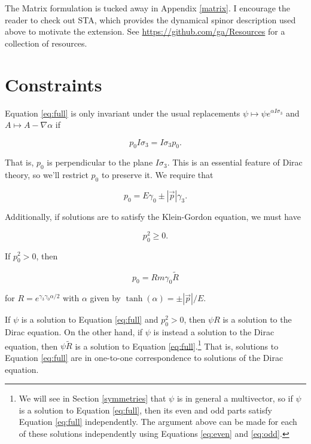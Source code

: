 \documentclass{article}
\begin{document}
  The Matrix formulation is tucked away in Appendix \ref{matrix}. I encourage the reader to check out STA, which provides the dynamical spinor description used above to motivate the extension. See \url{https://github.com/ga/Resources} for a collection of resources.

  \section{Constraints}\label{constraints}

  Equation \ref{eq:full} is only invariant under the usual replacements $\psi \mapsto \psi e^{\alpha I \sigma_3}$ and $A \mapsto A - \nabla \alpha$ if 

  \begin{equation}
    p_0 I\sigma_3 = I \sigma_3 p_0. \label{momentum-perp-spin}
  \end{equation} 

  That is, $p_0$ is perpendicular to the plane $I \sigma_3$. This is an essential feature of Dirac theory, so we'll restrict $p_0$ to preserve it. We require that

  \begin{equation}
    p_0 = E \gamma_0 \pm |\vec p| \gamma_3.
  \end{equation} 

  Additionally, if solutions are to satisfy the Klein-Gordon equation, we must have 

  \begin{equation}
    p_0^2 \geq 0.
  \end{equation}

  If $p_0^2 > 0$, then 

  \begin{equation}
    p_0 = R m \gamma_0 \widetilde R\label{eq:R}
  \end{equation} 

   for $R = e^{\gamma_3 \gamma_0 \alpha/2}$ with $\alpha$ given by $\tanh(\alpha) = \pm |\vec p|/E$. 

   If $\psi$ is a solution to Equation \ref{eq:full} and $p_0^2 > 0$, then $\psi R$ is a solution to the Dirac equation. On the other hand, if $\psi$ is instead a solution to the Dirac equation, then $\psi \widetilde R$ is a solution to Equation \ref{eq:full}.\footnote{We will see in Section \ref{symmetries} that $\psi$ is in general a multivector, so if $\psi$ is a solution to Equation \ref{eq:full}, then its even and odd parts satisfy Equation \ref{eq:full} independently. The argument above can be made for each of these solutions independently using Equations \ref{eq:even} and \ref{eq:odd}.} That is, solutions to Equation \ref{eq:full} are in one-to-one correspondence to solutions of the Dirac equation.
\end{document}
